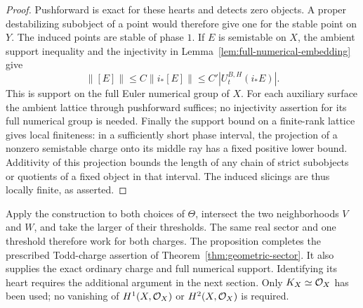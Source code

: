 \begin{proof}
Pushforward is exact for these hearts and detects zero objects.  A proper
destabilizing subobject of a point would therefore give one for the stable
point on $Y$.  The induced points are stable of phase $1$.
If $E$ is semistable on $X$, the ambient support inequality and the
injectivity in Lemma~\ref{lem:full-numerical-embedding} give
\[
 \|[E]\|\le C\|i_*[E]\|\le C'|U_t^{B,H}(i_*E)|.
\]
This is support on the full Euler numerical group of $X$.  For each
auxiliary surface the ambient lattice through pushforward suffices; no
injectivity assertion for its full numerical group is needed.
Finally the support bound on a finite-rank lattice gives local finiteness:
in a sufficiently short phase interval, the projection of a nonzero
semistable charge onto its middle ray has a fixed positive lower bound.
Additivity of this projection bounds the length of any chain of strict
subobjects or quotients of a fixed object in that interval.  The induced
slicings are thus locally finite, as asserted.
\end{proof}

Apply the construction to both choices of $\Theta$, intersect the two
neighborhoods $V$ and $W$, and take the larger of their thresholds.  The
same real sector and one threshold therefore work for both charges.
The proposition completes the prescribed Todd-charge assertion of
Theorem~\ref{thm:geometric-sector}.  It also supplies the exact ordinary
charge and full numerical support.  Identifying its heart requires the
additional argument in the next section.  Only $K_X\simeq\mathcal O_X$ has been
used; no vanishing of $H^1(X,\mathcal O_X)$ or $H^2(X,\mathcal O_X)$ is required.
